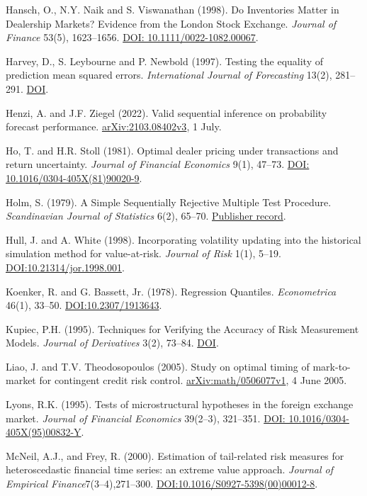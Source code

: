 \documentclass[10pt,a4paper]{article}
\begin{document}
Hansch, O., N.Y. Naik and S. Viswanathan (1998). Do Inventories Matter in Dealership Markets? Evidence from the London Stock Exchange. \emph{Journal of Finance} 53(5), 1623--1656. \href{https://doi.org/10.1111/0022-1082.00067}{DOI: 10.1111/0022-1082.00067}.

Harvey, D., S. Leybourne and P. Newbold (1997). Testing the equality of prediction mean squared errors. \emph{International Journal of Forecasting} 13(2), 281--291. \href{https://doi.org/10.1016/S0169-2070(96)00719-4}{DOI}.

Henzi, A. and J.F. Ziegel (2022). Valid sequential inference on probability forecast performance. \href{https://arxiv.org/abs/2103.08402v3}{arXiv:2103.08402v3}, 1 July.

Ho, T. and H.R. Stoll (1981). Optimal dealer pricing under transactions and return uncertainty. \emph{Journal of Financial Economics} 9(1), 47--73. \href{https://doi.org/10.1016/0304-405X(81)90020-9}{DOI: 10.1016/0304-405X(81)90020-9}.

Holm, S. (1979). A Simple Sequentially Rejective Multiple Test Procedure. \emph{Scandinavian Journal of Statistics} 6(2), 65--70. \href{https://www.jstor.org/stable/4615733}{Publisher record}.

Hull, J. and A. White (1998). Incorporating volatility updating into the historical simulation method for value-at-risk. \emph{Journal of Risk} 1(1), 5--19. \href{https://doi.org/10.21314/jor.1998.001}{DOI:10.21314/jor.1998.001}.

Koenker, R. and G. Bassett, Jr. (1978). Regression Quantiles. \emph{Econometrica} 46(1), 33--50. \href{https://doi.org/10.2307/1913643}{DOI:10.2307/1913643}.

Kupiec, P.H. (1995). Techniques for Verifying the Accuracy of Risk Measurement Models. \emph{Journal of Derivatives} 3(2), 73--84. \href{https://doi.org/10.3905/jod.1995.407942}{DOI}.

Liao, J. and T.V. Theodosopoulos (2005). Study on optimal timing of mark-to-market for contingent credit risk control. \href{https://arxiv.org/abs/math/0506077v1}{arXiv:math/0506077v1}, 4 June 2005.

Lyons, R.K. (1995). Tests of microstructural hypotheses in the foreign exchange market. \emph{Journal of Financial Economics} 39(2--3), 321--351. \href{https://doi.org/10.1016/0304-405X(95)00832-Y}{DOI: 10.1016/0304-405X(95)00832-Y}.

McNeil, A.J., and Frey, R. (2000). Estimation of tail-related risk measures for heteroscedastic financial time series: an extreme value approach. \emph{Journal of Empirical Finance}7(3--4),271--300. \href{https://doi.org/10.1016/S0927-5398(00)00012-8}{DOI:10.1016/S0927-5398(00)00012-8}.
\end{document}
